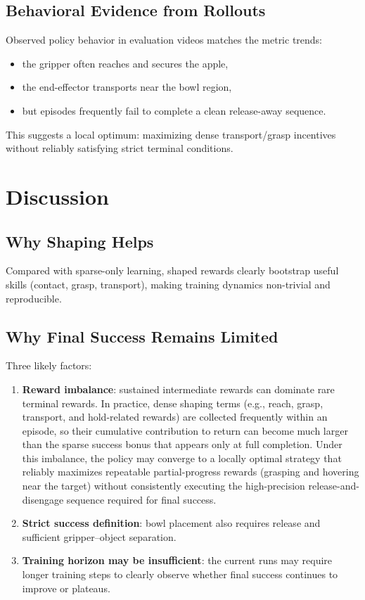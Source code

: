 \documentclass[11pt]{article}
\begin{document}
\subsection{Behavioral Evidence from Rollouts}
Observed policy behavior in evaluation videos matches the metric trends:
\begin{itemize}
  \item the gripper often reaches and secures the apple,
  \item the end-effector transports near the bowl region,
  \item but episodes frequently fail to complete a clean release-away sequence.
\end{itemize}
This suggests a local optimum: maximizing dense transport/grasp incentives without
reliably satisfying strict terminal conditions.

\section{Discussion}

\subsection{Why Shaping Helps}
Compared with sparse-only learning, shaped rewards clearly bootstrap useful
skills (contact, grasp, transport), making training dynamics non-trivial and
reproducible.

\subsection{Why Final Success Remains Limited}
Three likely factors:
\begin{enumerate}
  \item \textbf{Reward imbalance}: sustained intermediate rewards can dominate rare
    terminal rewards. In practice, dense shaping terms (e.g., reach, grasp,
    transport, and hold-related rewards) are collected frequently within an
    episode, so their cumulative contribution to return can become much larger
    than the sparse success bonus that appears only at full completion. Under
    this imbalance, the policy may converge to a locally optimal strategy that
    reliably maximizes repeatable partial-progress rewards (grasping and
    hovering near the target) without consistently executing the high-precision
    release-and-disengage sequence required for final success.
  \item \textbf{Strict success definition}: bowl placement also requires release
    and sufficient gripper--object separation.
  \item \textbf{Training horizon may be insufficient}: the current runs may
    require longer training steps to clearly observe whether final success
    continues to improve or plateaus.
\end{enumerate}
\end{document}
